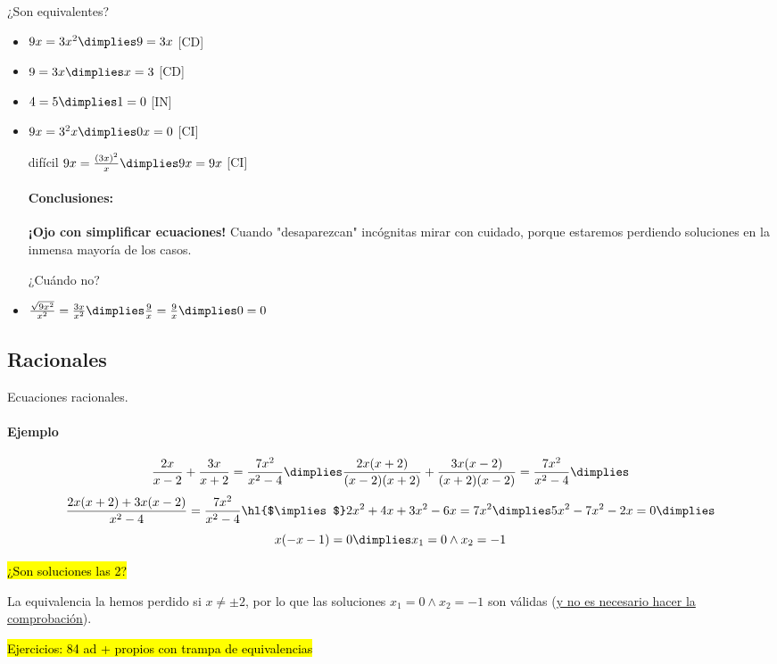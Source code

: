 \begin{example}
	¿Son equivalentes?
	\begin{itemize}
		\item $9x=3x^2 \dimplies 9=3x$ [CD]
		\item $9=3x \dimplies x=3$ [CD]
		\item $4=5 \dimplies 1=0$ [IN]
		\item $9x=3^2x \dimplies 0x=0$ [CI]
		\item[difícil] $9x=\frac{(3x)^2}{x} \dimplies 9x=9x$ [CI]

\paragraph{Conclusiones:} \textbf{¡Ojo con simplificar ecuaciones!} Cuando "desaparezcan" incógnitas mirar con cuidado, porque estaremos perdiendo soluciones en la inmensa mayoría de los casos.

¿Cuándo no?

	\item $\frac{\sqrt{9x^2}}{x^2}=\frac{3x}{x^2} \dimplies \frac{9}{x} = \frac{9}{x} \dimplies 0=0$
	\end{itemize}
\end{example}



\subsection{Racionales}

Ecuaciones racionales.

\paragraph{Ejemplo}
\[
	\frac{2x}{x-2} + \frac{3x}{x+2} = \frac{7x^2}{x^2-4} \dimplies \frac{2x(x+2)}{(x-2)(x+2)} + \frac{3x(x-2)}{(x+2)(x-2)} = \frac{7x^2}{x^2-4} \dimplies 
\]
\[
	\frac{2x(x+2)+3x(x-2)}{x^2-4} = \frac{7x^2}{x^2-4} \text{\hl{$\implies$}} 2x^2+4x+3x^2-6x=7x^2 \dimplies 5x^2-7x^2-2x = 0 \dimplies 
\]
\[
	x(-x-1) = 0 \dimplies x_1 = 0 \wedge x_2 = -1
\]

\hl{¿Son soluciones las 2?}

La equivalencia la hemos perdido si $x\neq \pm2$, por lo que las soluciones $x_1 = 0 \wedge x_2 = -1$ son válidas (\ul{y no es necesario hacer la comprobación}).



\hl{Ejercicios: 84 ad + propios con trampa de equivalencias}


